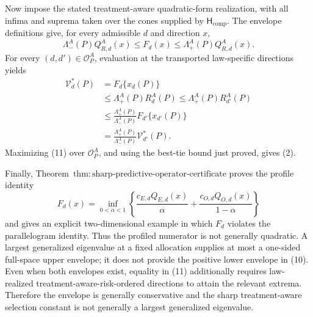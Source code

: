 Now impose the stated treatment-aware quadratic-form realization, with all infima and suprema taken over the cones supplied by \(\mathsf H_{\mathrm{comp}}\).  The envelope definitions give, for every admissible \(d\) and direction \(x\),
\[
 \Lambda_-^A(P)Q_{R,d}^A(x)
 \le F_d(x)
 \le \Lambda_+^A(P)Q_{R,d}^A(x).                           \tag{10}
\]
For every \((d,d')\in\mathcal O_P^A\), evaluation at the transported law-specific directions yields
\[
\begin{aligned}
 \mathcal V_d^*(P)
 &=F_d\{x_d(P)\}\\
 &\le\Lambda_+^A(P)R_d^A(P)
 \le\Lambda_+^A(P)R_{d'}^A(P)\\
 &\le\frac{\Lambda_+^A(P)}{\Lambda_-^A(P)}
 F_{d'}\{x_{d'}(P)\}\\
 &=\frac{\Lambda_+^A(P)}{\Lambda_-^A(P)}
 \mathcal V_{d'}^*(P).
\end{aligned}                                               \tag{11}
\]
Maximizing (11) over \(\mathcal O_P^A\), and using the best-tie bound just proved, gives (2).

Finally, Theorem~\(\mathrm{thm{:}sharp\text{-}predictive\text{-}operator\text{-}certificate}\) proves the profile identity
\[
 F_d(x)=\inf_{0<\alpha<1}
 \left\{
 \frac{c_{E,d}Q_{E,d}(x)}{\alpha}
 +\frac{c_{O,d}Q_{O,d}(x)}{1-\alpha}
 \right\}
\]
and gives an explicit two-dimensional example in which \(F_d\) violates the parallelogram identity.  Thus the profiled numerator is not generally quadratic.  A largest generalized eigenvalue at a fixed allocation supplies at most a one-sided full-space upper envelope; it does not provide the positive lower envelope in (10).  Even when both envelopes exist, equality in (11) additionally requires law-realized treatment-aware-risk-ordered directions to attain the relevant extrema.  Therefore the envelope is generally conservative and the sharp treatment-aware selection constant is not generally a largest generalized eigenvalue.